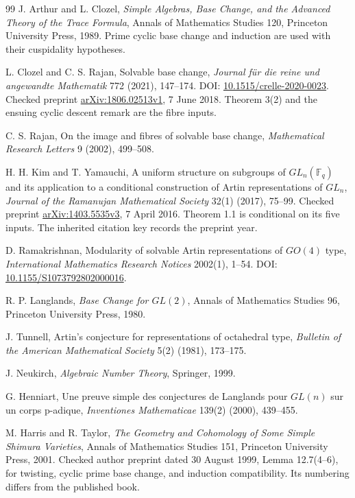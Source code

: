 \begin{thebibliography}{99}
J. Arthur and L. Clozel, \emph{Simple Algebras, Base Change, and the Advanced Theory of the Trace Formula}, Annals of Mathematics Studies 120, Princeton University Press, 1989. Prime cyclic base change and induction are used with their cuspidality hypotheses.

L. Clozel and C. S. Rajan, Solvable base change, \emph{Journal f\"ur die reine und angewandte Mathematik} 772 (2021), 147--174. DOI: \href{https://doi.org/10.1515/crelle-2020-0023}{10.1515/crelle-2020-0023}. Checked preprint \href{https://arxiv.org/abs/1806.02513}{arXiv:1806.02513v1}, 7 June 2018. Theorem 3(2) and the ensuing cyclic descent remark are the fibre inputs.

C. S. Rajan, On the image and fibres of solvable base change, \emph{Mathematical Research Letters} 9 (2002), 499--508.

H. H. Kim and T. Yamauchi, A uniform structure on subgroups of \(GL_n(\mathbb F_q)\) and its application to a conditional construction of Artin representations of \(GL_n\), \emph{Journal of the Ramanujan Mathematical Society} 32(1) (2017), 75--99. Checked preprint \href{https://arxiv.org/abs/1403.5535}{arXiv:1403.5535v3}, 7 April 2016. Theorem 1.1 is conditional on its five inputs. The inherited citation key records the preprint year.

D. Ramakrishnan, Modularity of solvable Artin representations of \(GO(4)\) type, \emph{International Mathematics Research Notices} 2002(1), 1--54. DOI: \href{https://doi.org/10.1155/S1073792802000016}{10.1155/S1073792802000016}.

R. P. Langlands, \emph{Base Change for \(GL(2)\)}, Annals of Mathematics Studies 96, Princeton University Press, 1980.

J. Tunnell, Artin's conjecture for representations of octahedral type, \emph{Bulletin of the American Mathematical Society} 5(2) (1981), 173--175.

J. Neukirch, \emph{Algebraic Number Theory}, Springer, 1999.

G. Henniart, Une preuve simple des conjectures de Langlands pour \(GL(n)\) sur un corps p-adique, \emph{Inventiones Mathematicae} 139(2) (2000), 439--455.

M. Harris and R. Taylor, \emph{The Geometry and Cohomology of Some Simple Shimura Varieties}, Annals of Mathematics Studies 151, Princeton University Press, 2001. Checked author preprint dated 30 August 1999, Lemma 12.7(4--6), for twisting, cyclic prime base change, and induction compatibility. Its numbering differs from the published book.


\end{thebibliography}

